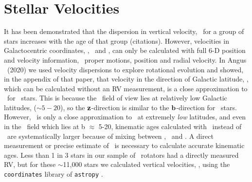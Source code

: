 \section{Stellar Velocities}
\label{sec:velocities}

It has been demonstrated that the dispersion in vertical velocity, \vz\, for a
group of stars increases with the age of that group (citations).
However, velocities in Galactocentric coordinates, \vx, \vy\ and \vz, can only
be calculated with full 6-D position and velocity information, \ie\ proper
motions, position and radial velocity.
In Angus \etal\ (2020) we used velocity dispersions to explore rotational
evolution and showed, in the appendix of that paper, that velocity in the
direction of Galactic latitude, \vb, which can be calculated without an RV
measurement, is a close approximation to \vz\ for \kepler\ stars.
This is because the \kepler\ field of view lies at relatively low Galactic
latitudes, ($\sim 5-20$\degrees), so the ${\bf z}$-direction is similar to the
${\bf b}$-direction for \kepler\ stars.
However, \vb\ is only a close approximation to \vz\ at extremely {\it low}
latitudes, and even in the \kepler\ field which lies at b $\approx$
5-20\degrees, kinematic ages calculated with \vb\ instead of \vz\ are
systematically larger because of mixing between \vz, \vx\ and \vy.
A direct measurement or precise estimate of \vz\ is necessary to calculate
accurate kinematic ages.
Less than 1 in 3 stars in our sample of \kepler\ rotators had a directly
measured RV, but for these $\sim$11,000 stars we calculated vertical
velocities, \vz, using the {\tt coordinates} library of {\tt astropy}
\citep{astropy2013, astropy2018}.


